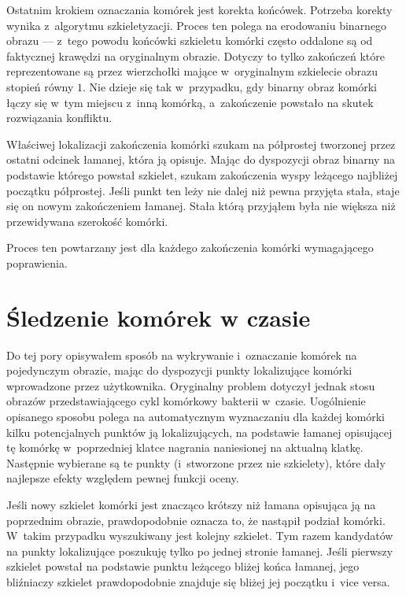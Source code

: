 \documentclass[declaration,shortabstract,mgr]{iithesis}
\begin{document}
Ostatnim krokiem oznaczania komórek jest korekta końcówek.
Potrzeba korekty wynika z~algorytmu szkieletyzacji.
Proces ten polega na erodowaniu binarnego obrazu --- z~tego powodu końcówki szkieletu komórki często oddalone są od faktycznej krawędzi na oryginalnym obrazie.
Dotyczy to tylko zakończeń które reprezentowane są przez wierzchołki mające w~oryginalnym szkielecie obrazu stopień równy $1$.
Nie dzieje się tak w~przypadku, gdy binarny obraz komórki łączy się w~tym miejscu z~inną komórką, a~zakończenie powstało na skutek rozwiązania konfliktu.

Właściwej lokalizacji zakończenia komórki szukam na półprostej tworzonej przez ostatni odcinek łamanej, która ją opisuje.
Mając do dyspozycji obraz binarny na podstawie którego powstał szkielet, szukam zakończenia wyspy leżącego najbliżej początku półprostej.
Jeśli punkt ten leży nie dalej niż pewna przyjęta stała, staje się on nowym zakończeniem łamanej.
Stała którą przyjąłem była nie większa niż przewidywana szerokość komórki.

Proces ten powtarzany jest dla każdego zakończenia komórki wymagającego poprawienia.

\section{Śledzenie komórek w czasie}
\label{sec:cell-tracking}

Do tej pory opisywałem sposób na wykrywanie i~oznaczanie komórek na pojedynczym obrazie, mając do dyspozycji punkty lokalizujące komórki wprowadzone przez użytkownika.
Oryginalny problem dotyczył jednak stosu obrazów przedstawiającego cykl komórkowy bakterii w~czasie.
Uogólnienie opisanego sposobu polega na automatycznym wyznaczaniu dla każdej komórki kilku potencjalnych punktów ją lokalizujących, na podstawie łamanej opisującej tę komórkę w~poprzedniej klatce nagrania naniesionej na aktualną klatkę.
Następnie wybierane są te punkty (i~stworzone przez nie szkielety), które dały najlepsze efekty względem pewnej funkcji oceny.

Jeśli nowy szkielet komórki jest znacząco krótszy niż łamana opisująca ją na poprzednim obrazie, prawdopodobnie oznacza to, że nastąpił podział komórki. W~takim przypadku wyszukiwany jest kolejny szkielet. Tym razem kandydatów na punkty lokalizujące poszukuję tylko po jednej stronie łamanej. Jeśli pierwszy szkielet powstał na podstawie punktu leżącego bliżej końca łamanej, jego bliźniaczy szkielet prawdopodobnie znajduje się bliżej jej początku i~vice versa.
\end{document}
